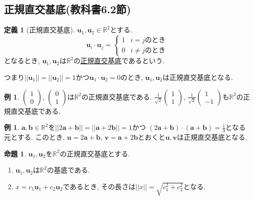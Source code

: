 \documentclass[dvipdfmx,a4paper,11pt]{article}
\newcommand{\R}{\mathbb{R}}
\theoremstyle{definition}
\newtheorem{prop}[thm]{命題}
\newtheorem{dfn}[thm]{定義}
\newtheorem{exa}[thm]{例}
\begin{document}
 
 
 \subsection{正規直交基底(教科書6.2節)}
 
   \begin{tcolorbox}[
    colback = white,
    colframe = green!35!black,
    fonttitle = \bfseries,
    breakable = true]
    \begin{dfn}[正規直交基底]
$\bm{u}_1, \bm{u}_2 \in \R^2$とする. 
$$
\bm{u}_i\cdot \bm{u}_j =
\left\{
\begin{array}{ll}
1 & \text{$i=j$のとき} \\
0 & \text{$i\neq j$のとき}
\end{array}
\right.
$$
となるとき, $\bm{u}_1, \bm{u}_2 $は$\R^2$の\underline{正規直交基底}であるという. 
  \end{dfn}
 \end{tcolorbox}
 つまり$||\bm{u}_1|| =||\bm{u}_2|| =1$かつ$\bm{u}_1\cdot \bm{u}_2 =0$のとき, $\bm{u}_1, \bm{u}_2 $は正規直交基底となる.
 
 
 \begin{exa}
 $  \begin{pmatrix}
1 \\ 0
 \end{pmatrix}  
 $,
  $  \begin{pmatrix}
0 \\ 1
 \end{pmatrix}  
 $は$\R^2$の正規直交基底である.
 $  \frac{1}{\sqrt{2}}\begin{pmatrix}
1 \\ 1
 \end{pmatrix}  
 $,
  $  \frac{1}{\sqrt{2}}\begin{pmatrix}
1 \\ -1
 \end{pmatrix}  
 $も$\R^2$の正規直交基底である. 
 \end{exa}

 \begin{exa}
 $\bm{a}, \bm{b} \in \R^2$を$|| 2\bm{a}+\bm{b}|| =|| \bm{a}+2\bm{b}|| =1$かつ
 $(2\bm{a}+\bm{b})\cdot (\bm{a}+\bm{b})=\frac{1}{3}$となる元とする. 
 このとき, $\bm{u}=2\bm{a}+\bm{b}$, $\bm{v}=\bm{a}+2\bm{b}$とおくと$\bm{u}, \bm{v}$は正規直交基底となる. 
 \end{exa}



   \begin{tcolorbox}[
    colback = white,
    colframe = green!35!black,
    fonttitle = \bfseries,
    breakable = true]
    \begin{prop}
     $\bm{u}_1, \bm{u}_2 $を$\R^2$の正規直交基底とする.
  \begin{enumerate}
  \setlength{\parskip}{0cm}
 \setlength{\itemsep}{0pt} 
\item  $\bm{u}_1, \bm{u}_2 $は$\R^2$の基底である.
\item $x = c_1\bm{u}_1 + c_2\bm{u}_2$であるとき, その長さは$|| x ||=\sqrt{c_{1}^{2} + c_{2}^{2}}$となる. 
  \end{enumerate}
  \end{prop}
 \end{tcolorbox}
 
\end{document}
